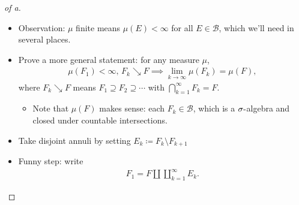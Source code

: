 \begin{solution}

\envlist

\begin{proof}[of a]

\begin{itemize}
\item
  Observation: \(\mu\) finite means \(\mu(E) < \infty\) for all
  \(E \in\mathcal{B}\), which we'll need in several places.
\item
  Prove a more general statement: for any measure \(\mu\),
  \begin{align*}
  \mu(F_1) < \infty,\, F_k \searrow F \implies \lim_{k\to\infty}\mu(F_k) = \mu(F)
  ,\end{align*}
  where \(F_k \searrow F\) means \(F_1 \supseteq F_2 \supseteq \cdots\)
  with \(\displaystyle\bigcap_{k=1}^\infty F_k = F\).

  \begin{itemize}
  \tightlist
  \item
    Note that \(\mu(F)\) makes sense: each \(F_k \in \mathcal{B}\),
    which is a \(\sigma{\hbox{-}}\)algebra and closed under countable
    intersections.
  \end{itemize}
\item
  Take disjoint annuli by setting
  \(E_k \coloneqq F_k \setminus F_{k+1}\)
\item
  Funny step: write
  \begin{align*}
  F_1 = F {\textstyle\coprod}\displaystyle\coprod_{k=1}^{\infty} E_k
  .\end{align*}


\end{itemize}
\end{proof}
\end{solution}
